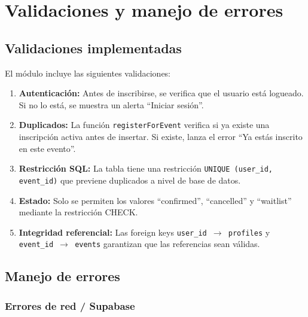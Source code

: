
\section{Validaciones y manejo de errores}

\subsection{Validaciones implementadas}

El m\'odulo incluye las siguientes validaciones:

\begin{enumerate}
  \item \textbf{Autenticaci\'on:} Antes de inscribirse, se verifica
    que el usuario est\'a logueado. Si no lo est\'a, se muestra un
    alerta ``Iniciar sesi\'on''.

  \item \textbf{Duplicados:} La funci\'on \texttt{registerForEvent}
    verifica si ya existe una inscripci\'on activa antes de insertar.
    Si existe, lanza el error ``Ya est\'as inscrito en este evento''.

  \item \textbf{Restricci\'on SQL:} La tabla tiene una restricci\'on
    \texttt{UNIQUE (user\_id, event\_id)} que previene duplicados
    a nivel de base de datos.

  \item \textbf{Estado:} Solo se permiten los valores ``confirmed'',
    ``cancelled'' y ``waitlist'' mediante la restricci\'on CHECK.

  \item \textbf{Integridad referencial:} Las foreign keys
    \texttt{user\_id $\to$ profiles} y \texttt{event\_id $\to$ events}
    garantizan que las referencias sean v\'alidas.
\end{enumerate}

\subsection{Manejo de errores}

\subsubsection*{Errores de red / Supabase}

